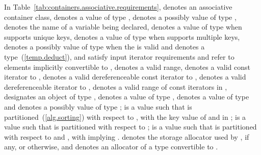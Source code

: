 \pnum
In Table~\ref{tab:containers.associative.requirements},
 denotes an associative container class,
 denotes a value of type ,
     denotes a possibly  value of type , 
 denotes the name of a variable being declared,
 denotes a value of type 
when  supports unique keys,
 denotes a value of type 
when  supports multiple keys,
 denotes a possibly  value of type 
when the 
 is valid
and denotes a type~(\ref{temp.deduct}),
 and 
satisfy input iterator requirements and refer to elements
implicitly convertible to
, 
denotes a valid range,
 denotes a valid const iterator to ,
 denotes a valid dereferenceable const iterator to ,
 denotes a valid dereferenceable iterator to ,
\tcode{[q1, q2)} denotes a valid range of const iterators in ,
 designates an object of type ,
 denotes a value of type ,
 denotes a value of type 
and  denotes a possibly  value of type ;
 is a value such that  is partitioned~(\ref{alg.sorting})
with respect to , with  the key value of 
and  in ;
 is a value such that  is partitioned with respect to
;
 is a value such that  is partitioned with respect to
 and , with  implying
.
 denotes the storage allocator used by , if any, or  otherwise, and  denotes an allocator of a type convertible to .

